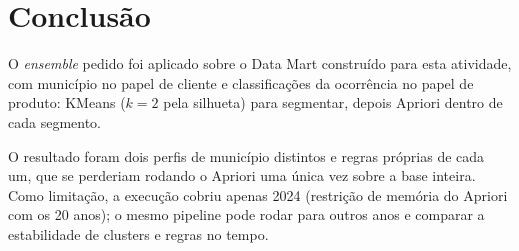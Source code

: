 
\chapter{Conclusão}
\label{cap:conclusao}

O \textit{ensemble} pedido foi aplicado sobre o Data Mart construído para
esta atividade, com município no papel de cliente e classificações da
ocorrência no papel de produto: KMeans ($k=2$ pela silhueta) para segmentar,
depois Apriori dentro de cada segmento.

O resultado foram dois perfis de município distintos e regras próprias de
cada um, que se perderiam rodando o Apriori uma única vez sobre a base
inteira. Como limitação, a execução cobriu apenas 2024 (restrição de memória
do Apriori com os 20 anos); o mesmo pipeline pode rodar para outros anos e
comparar a estabilidade de clusters e regras no tempo.
